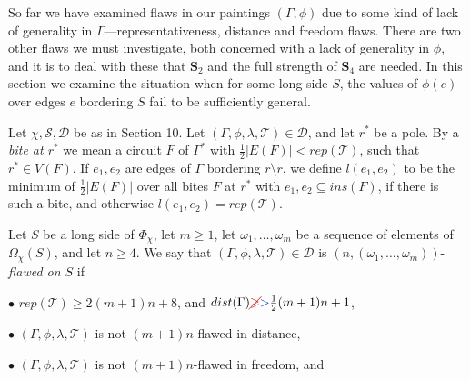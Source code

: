 
So far we have examined flaws in our paintings $(\Gamma, \phi)$ due to some kind of lack of generality in $\Gamma$---representativeness, distance and freedom flaws. There are two other flaws we must investigate, both concerned with a lack of generality in $\phi$, and it is to deal with these that $\mathbf{S}_2$ and the full strength of $\mathbf{S}_4$ are needed. In this section we examine the situation when for some long side $S$, the values of $\phi(e)$ over edges $e$ bordering $S$ fail to be sufficiently general.

Let $\chi, \mathscr{S}, \mathscr{D}$ be as in Section 10. Let $(\Gamma, \phi, \lambda, \mathscr{T}) \in \mathscr{D}$, and let $r^*$ be a pole. By a \textit{bite at $r^*$} we mean a circuit $F$ of $\Gamma^*$ with $\frac{1}{2}|E(F)| < rep(\mathscr{T})$, such that $r^* \in V(F)$. If $e_1, e_2$ are edges of $\Gamma$ bordering $\bar{r}\setminus r$, we define $l(e_1, e_2)$ to be the minimum of $\frac{1}{2}|E(F)|$ over all bites $F$ at $r^*$ with $e_1, e_2 \subseteq ins(F)$, if there is such a bite, and otherwise $l(e_1, e_2) = rep(\mathscr{T})$.

Let $S$ be a long side of $\Phi_\chi$, let $m \ge 1$, let $\omega_1, \dots, \omega_m$ be a sequence of elements of $\Omega_\chi(S)$, and let $n \ge 4$. We say that $(\Gamma, \phi, \lambda, \mathscr{T}) \in \mathscr{D}$ is $(n, (\omega_1, \dots, \omega_m))$-\textit{flawed on $S$} if

\hspace*{12pt}$\bullet$ $rep(\mathscr{T}) \ge 2(m + 1)n + 8$, and $dist(\Gamma) \delm{\ge}\fix{>} \frac{1}{2}(m + 1)n + 1$,

\hspace*{12pt}$\bullet$ $(\Gamma, \phi, \lambda, \mathscr{T})$ is not $(m + 1)n$-flawed in distance,

\hspace*{12pt}$\bullet$ $(\Gamma, \phi, \lambda, \mathscr{T})$ is not $(m + 1)n$-flawed in freedom, and
